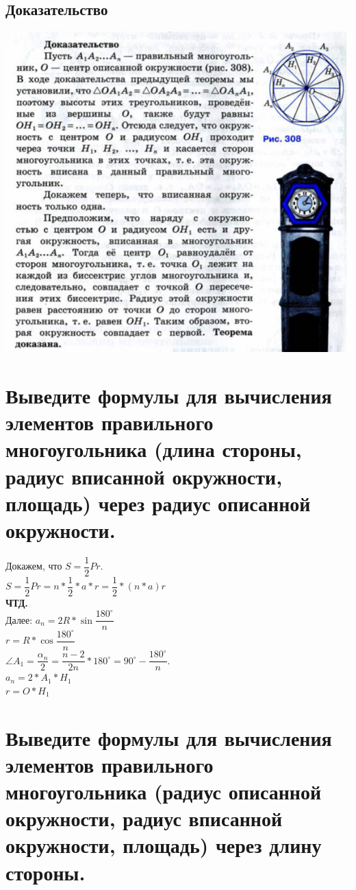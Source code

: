 \documentclass[12pt, letterpaper]{article}
\begin{document}
\subsection{Доказательство}
\includegraphics[scale=0.3]{photo5.jpg}

\section {Выведите формулы для вычисления элементов правильного многоугольника (длина стороны, радиус вписанной окружности,  площадь) через радиус описанной окружности.}
Докажем, что $S=\dfrac{1}{2}Pr$. \\
$S=\dfrac{1}{2}Pr=n*\dfrac{1}{2}*a*r=\dfrac{1}{2}*(n*a)r$ \\ 
\textbf{ЧТД.} \\
Далее:
$ a_n=2R*\sin \dfrac{180^{\circ}}{n} $ \\
$ r=R*\cos \dfrac{180^{\circ}}{n}$ \\
$ \angle A_1 = \dfrac{\alpha_n}{2}=\dfrac{n-2}{2n}*180^{\circ}=90^{\circ}-\dfrac{180^{\circ}}{n}. $ \\
$ a_n=2*A_1*H_1 $ \\
$ r=O*H_1 $ \\

\section {Выведите формулы для вычисления элементов правильного многоугольника (радиус описанной окружности, радиус вписанной окружности, площадь) через длину стороны.}
\end{document}
